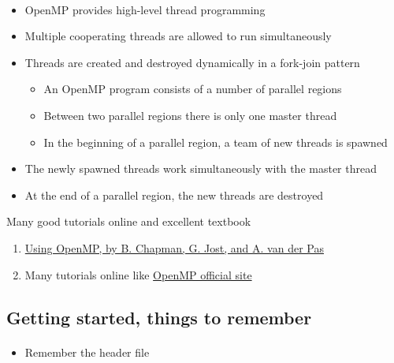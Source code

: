 \documentclass[%
oneside,                 %
final,                   %
10pt]{article}
\begin{document}
\paragraph{}
\begin{itemize}
\item OpenMP provides high-level thread programming

\item Multiple cooperating threads are allowed to run simultaneously

\item Threads are created and destroyed dynamically in a fork-join pattern
\begin{itemize}

   \item An OpenMP program consists of a number of parallel regions

   \item Between two parallel regions there is only one master thread

   \item In the beginning of a parallel region, a team of new threads is spawned

\end{itemize}

\noindent
  \item The newly spawned threads work simultaneously with the master thread

  \item At the end of a parallel region, the new threads are destroyed
\end{itemize}

\noindent
Many good tutorials online and excellent textbook
\begin{enumerate}
\item \href{{http://mitpress.mit.edu/books/using-openmp}}{Using OpenMP, by B. Chapman, G. Jost, and A. van der Pas}

\item Many tutorials online like \href{{http://www.openmp.org}}{OpenMP official site}
\end{enumerate}

\noindent



\subsection*{Getting started, things to remember}

\paragraph{}
\begin{itemize}
 \item Remember the header file 
\end{itemize}
\end{document}
